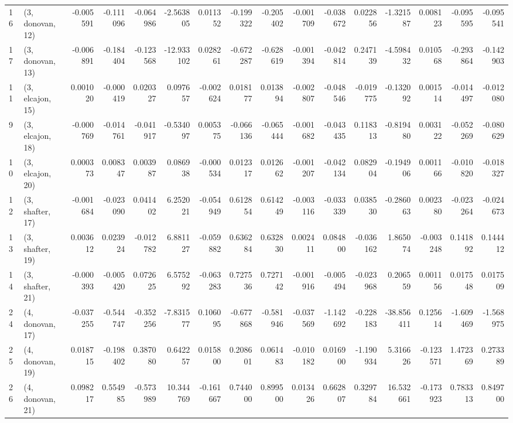 \begin{tabular}{llrrrrrrrrrrrrrr}
16 &  (3, donovan, 12) &  -0.005591 & -0.111096 & -0.064986 &  -2.563805 &  0.011352 &  -0.199322 & -0.205402 & -0.001709 & -0.038672 &  0.022856 &  -1.321587 &  0.008123 & -0.095595 & -0.095541 \\
17 &  (3, donovan, 13) &  -0.006891 & -0.184404 & -0.123568 & -12.933102 &  0.028261 &  -0.672287 & -0.628619 & -0.001394 & -0.042814 &  0.247139 &  -4.598432 &  0.010568 & -0.293864 & -0.142903 \\
11 &  (3, elcajon, 15) &   0.001020 & -0.000419 &  0.020327 &   0.097657 & -0.002624 &   0.018177 &  0.013894 & -0.002807 & -0.048546 & -0.019775 &  -0.132092 &  0.001514 & -0.014497 & -0.012080 \\
9  &  (3, elcajon, 18) &  -0.000769 & -0.014761 & -0.041917 &  -0.534097 &  0.005375 &  -0.066136 & -0.065444 & -0.001682 & -0.043435 &  0.118313 &  -0.819480 &  0.003122 & -0.052269 & -0.080629 \\
10 &  (3, elcajon, 20) &   0.000373 &  0.008347 &  0.003987 &   0.086938 & -0.000534 &   0.012317 &  0.012662 & -0.001207 & -0.042134 &  0.082904 &  -0.194906 &  0.001166 & -0.010820 & -0.018327 \\
12 &  (3, shafter, 17) &  -0.001684 & -0.023090 &  0.041402 &   6.252021 & -0.054949 &   0.612854 &  0.614249 & -0.003116 & -0.033339 &  0.038530 &  -0.286063 &  0.002380 & -0.023264 & -0.024673 \\
13 &  (3, shafter, 19) &   0.003612 &  0.023924 & -0.012782 &   6.881127 & -0.059882 &   0.636284 &  0.632830 &  0.002411 &  0.084800 & -0.036162 &   1.865074 & -0.003248 &  0.141892 &  0.144412 \\
14 &  (3, shafter, 21) &  -0.000393 & -0.005420 &  0.072625 &   6.575292 & -0.063283 &   0.727536 &  0.727142 & -0.001916 & -0.005494 & -0.023968 &   0.206559 &  0.001156 &  0.017548 &  0.017509 \\
24 &  (4, donovan, 17) &  -0.037255 & -0.544747 & -0.352256 &  -7.831577 &  0.106095 &  -0.677868 & -0.581946 & -0.037569 & -1.142692 & -0.228183 & -38.856411 &  0.125614 & -1.609469 & -1.568975 \\
25 &  (4, donovan, 19) &   0.018715 & -0.198402 &  0.387080 &   0.642257 &  0.015800 &   0.208601 &  0.061483 & -0.010182 &  0.016900 & -1.190934 &   5.316626 & -0.123571 &  1.472369 &  0.273389 \\
26 &  (4, donovan, 21) &   0.098217 &  0.554985 & -0.573989 &  10.344769 & -0.161667 &   0.744000 &  0.899500 &  0.013426 &  0.662807 &  0.329784 &  16.532661 & -0.173923 &  0.783313 &  0.849700 \\

\end{tabular}
